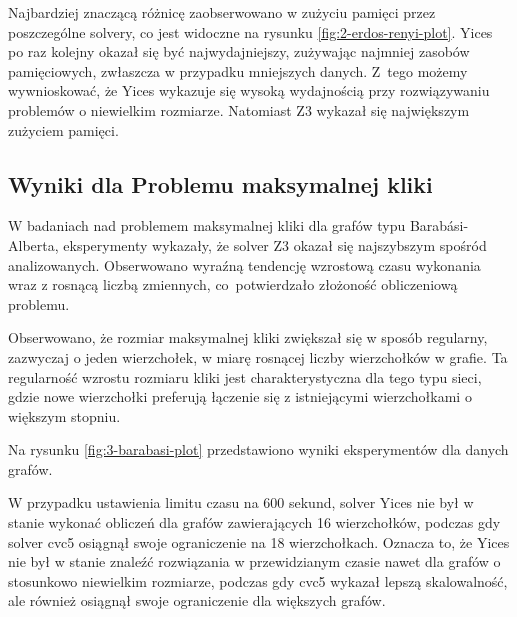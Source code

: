 
Najbardziej znaczącą różnicę zaobserwowano w zużyciu pamięci przez poszczególne solvery, co jest widoczne na rysunku \ref{fig:2-erdos-renyi-plot}. Yices po raz kolejny okazał się być najwydajniejszy, zużywając najmniej zasobów pamięciowych, zwłaszcza w przypadku mniejszych danych. Z~tego możemy wywnioskować, że Yices wykazuje się wysoką wydajnością przy rozwiązywaniu problemów o niewielkim rozmiarze. Natomiast Z3 wykazał się największym zużyciem pamięci.

\subsection{Wyniki dla Problemu maksymalnej kliki}

W badaniach nad problemem maksymalnej kliki dla grafów typu Barabási-Alberta, eksperymenty wykazały, że solver Z3 okazał się najszybszym spośród analizowanych. Obserwowano wyraźną tendencję wzrostową czasu wykonania wraz z rosnącą liczbą zmiennych, co~potwierdzało złożoność obliczeniową problemu.

Obserwowano, że rozmiar maksymalnej kliki zwiększał się w sposób regularny, zazwyczaj o jeden wierzchołek, w miarę rosnącej liczby wierzchołków w grafie. Ta regularność wzrostu rozmiaru kliki jest charakterystyczna dla tego typu sieci, gdzie nowe wierzchołki preferują łączenie się z istniejącymi wierzchołkami o większym stopniu.

Na rysunku \ref{fig:3-barabasi-plot} przedstawiono wyniki eksperymentów dla danych grafów.

W przypadku ustawienia limitu czasu na 600 sekund, solver Yices nie był w stanie wykonać obliczeń dla grafów zawierających 16 wierzchołków, podczas gdy solver cvc5 osiągnął swoje ograniczenie na 18 wierzchołkach. Oznacza to, że Yices nie był w stanie znaleźć rozwiązania w przewidzianym czasie nawet dla grafów o stosunkowo niewielkim rozmiarze, podczas gdy cvc5 wykazał lepszą skalowalność, ale również osiągnął swoje ograniczenie dla większych grafów.

